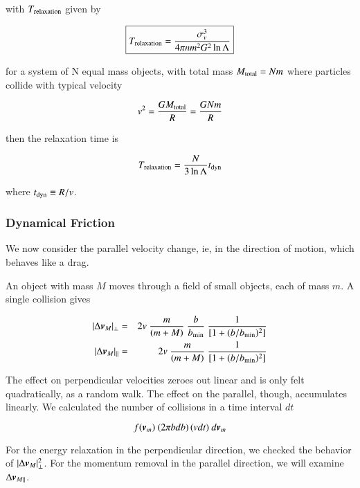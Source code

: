 with $T_{\rm relaxation}$ given by 

\begin{equation}
\boxed{
T_{\rm relaxation} = \frac{\sigma_v^3}{4\pi n m^2 G^2 \ln \Lambda}
}
\end{equation}


for a system of N equal mass objects, with total mass $M_{\rm total} = Nm$ where particles collide with typical velocity 

\begin{equation}
v^2 = \frac{GM_{\rm total}}{R} = \frac{G N m}{R}
\end{equation}

then the relaxation time is 

\begin{equation}
T_{\rm relaxation} = \frac{N}{3\ln \Lambda} t_{\rm dyn}
\end{equation}

where $t_{\rm dyn} \equiv R/v$. 

\subsubsection{Dynamical Friction}

We now consider the parallel velocity change, ie, in the direction of motion, which behaves like a drag. 

An object with mass $M$ moves through a field of small objects, each of mass $m$. A single collision gives 

\begin{eqnarray}
|\Delta \v{v}_{M}|_\perp &=& 2v \ \frac{m}{(m+M)} \ \frac{b}{b_{\rm min}}\ \frac{1}{[1+(b/b_{\rm min})^2]}\\
|\Delta \v{v}_{M}|_{||} &=& 2v \ \frac{m}{(m+M)} \ \frac{1}{[1+(b/b_{\rm min})^2]}
\end{eqnarray}

The effect on perpendicular velocities zeroes out linear and is only felt quadratically, as a random walk. The effect on the parallel, though, accumulates linearly. We calculated the number of collisions in a time interval $dt$ 

\begin{equation}
f(\v{v}_m) \ (2\pi b db)\,(v dt) \ d\v{v}_m
\end{equation}


For the energy relaxation in the perpendicular direction, we checked the behavior of $|\Delta {\boldsymbol{v}}_{M}|_\perp^2$. For the momentum removal in the parallel direction, we will examine $\Delta {\boldsymbol{v}}_{{M}{||}}$.


